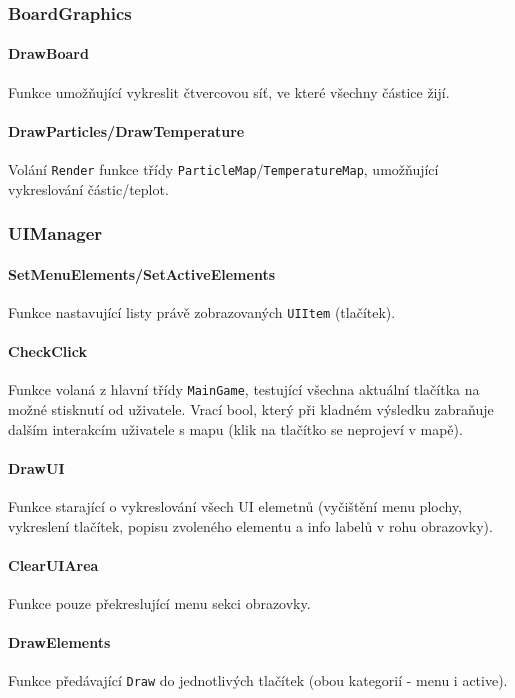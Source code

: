 \documentclass[a4paper, 12pt]{article}
\begin{document}
\subsubsection{BoardGraphics}
\paragraph{DrawBoard}
Funkce umožňující vykreslit čtvercovou síť, ve které všechny částice
žijí.

\paragraph{DrawParticles/DrawTemperature}
Volání \texttt{Render} funkce třídy \texttt{ParticleMap}/\texttt{TemperatureMap}, umožňující
vykreslování částic/teplot.

\subsubsection{UIManager}
\paragraph{SetMenuElements/SetActiveElements}
Funkce nastavující listy právě zobrazovaných \texttt{UIItem} (tlačítek).

\paragraph{CheckClick}
Funkce volaná z hlavní třídy \texttt{MainGame}, testující všechna aktuální
tlačítka na možné stisknutí od uživatele. Vrací bool, který při kladném
výsledku zabraňuje dalším interakcím uživatele s mapu (klik na tlačítko se
neprojeví v mapě).

\paragraph{DrawUI}
Funkce starající o vykreslování všech UI elemetnů (vyčištění menu plochy,
vykreslení tlačítek, popisu zvoleného elementu a info labelů v rohu obrazovky).

\paragraph{ClearUIArea}
Funkce pouze překreslující menu sekci obrazovky.

\paragraph{DrawElements}
Funkce předávající \texttt{Draw} do jednotlivých tlačítek (obou kategorií -
menu i active).
\end{document}
